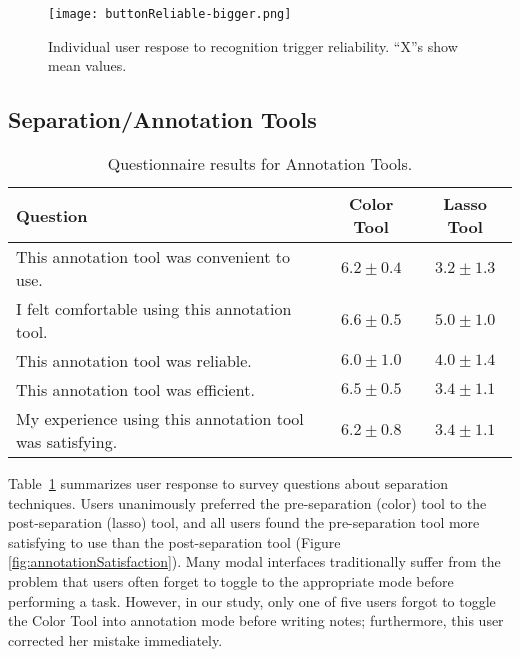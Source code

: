\documentclass{egpubl}
\begin{document}
\begin{figure}[tb]
  \centering
  \texttt{[image: buttonReliable-bigger.png]}
  \caption{\label{fig:buttonReliabilityChart}
           Individual user respose to recognition trigger
           reliability. ``X''s show mean values.}
\end{figure}


\subsection{Separation/Annotation Tools}

\begin{table}
  \centering
	\begin{tabular}{|p{.45\linewidth}|c||c|}
	\hline 
  Question 																									& Color Tool & Lasso Tool \\
  \hline
  This annotation tool was convenient to use.								& $6.2\pm0.4$ & $3.2\pm1.3$  \\
  \hline
  I felt comfortable using this annotation tool.						& $6.6\pm0.5$ & $5.0\pm1.0$  \\
  \hline
  This annotation tool was reliable.												& $6.0\pm1.0$ & $4.0\pm1.4$  \\
  \hline
  This annotation tool was efficient.												& $6.5\pm0.5$ & $3.4\pm1.1$  \\
  \hline
  My experience using this annotation tool was satisfying.	& $6.2\pm0.8$ & $3.4\pm1.1$  \\
  \hline
	\end{tabular}
	\caption{Questionnaire results for Annotation Tools.}
	\label{tab:TableBAnnotationData}
\end{table}


Table~\ref{tab:TableBAnnotationData} summarizes user response to
survey questions about separation techniques.  Users unanimously
preferred the pre-separation (color) tool to the post-separation
(lasso) tool, and all users found the pre-separation tool more
satisfying to use than the post-separation tool (Figure
\ref{fig:annotationSatisfaction}).  Many modal interfaces
traditionally suffer from the problem that users often forget to
toggle to the appropriate mode before performing a task.  However, in
our study, only one of five users forgot to toggle the Color Tool into
annotation mode before writing notes; furthermore, this user corrected
her mistake immediately.
\end{document}
